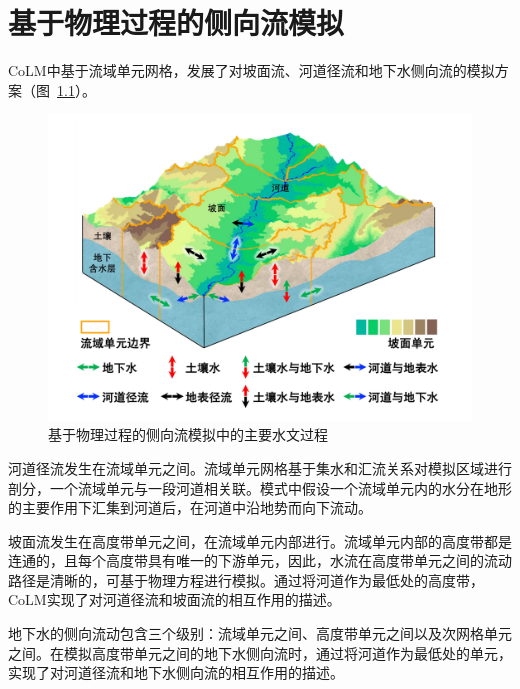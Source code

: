 \chapter{基于物理过程的侧向流模拟}

CoLM中基于流域单元网格，发展了对坡面流、河道径流和地下水侧向流的模拟方案（图~\ref{fig:主要水文过程}）。

{
\begin{figure}[htbp]
\centering
\includegraphics[width=\textwidth]{Figures/侧向流/主要水文过程.jpg}
\caption{基于物理过程的侧向流模拟中的主要水文过程}
\label{fig:主要水文过程}
\end{figure}
}

河道径流发生在流域单元之间。流域单元网格基于集水和汇流关系对模拟区域进行剖分，一个流域单元与一段河道相关联。模式中假设一个流域单元内的水分在地形的主要作用下汇集到河道后，在河道中沿地势而向下流动。

坡面流发生在高度带单元之间，在流域单元内部进行。流域单元内部的高度带都是连通的，且每个高度带具有唯一的下游单元，因此，水流在高度带单元之间的流动路径是清晰的，可基于物理方程进行模拟。通过将河道作为最低处的高度带，CoLM实现了对河道径流和坡面流的相互作用的描述。

地下水的侧向流动包含三个级别：流域单元之间、高度带单元之间以及次网格单元之间。在模拟高度带单元之间的地下水侧向流时，通过将河道作为最低处的单元，实现了对河道径流和地下水侧向流的相互作用的描述。

